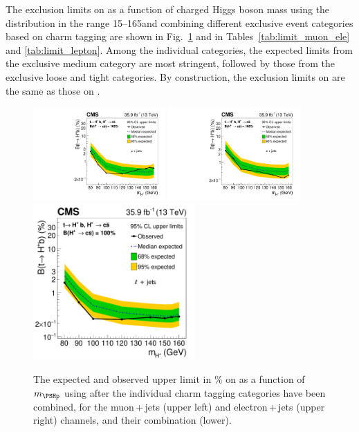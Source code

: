 The exclusion limits on \Bthb as a function of
charged Higgs boson mass using the \mjj distribution in the range 
15--165\GeV and combining
different exclusive event categories based on charm tagging are shown
in Fig.~\ref{fig:limitPlot} and in Tables~\ref{tab:limit_muon_ele} and
\ref{tab:limit_lepton}. Among the individual categories, the expected
limits from the exclusive medium category are most stringent, followed
by those from the exclusive loose and tight categories. By construction,
the exclusion limits on \Bthbbar are the same as those on \Bthb.
\begin{figure}
    \centering
    \includegraphics[width=0.45\textwidth]{Figure_004-a.pdf}
    \includegraphics[width=0.45\textwidth]{Figure_004-b.pdf}
    \includegraphics[width=0.55\textwidth]{Figure_004-c.pdf}
    \caption{The expected and observed upper limit in \% on
        \Bthb as a function of $\mhp$
        using \mjj after the individual charm tagging categories have
        been combined, for the muon\,+\,jets (upper left) and
        electron\,+\,jets (upper right) channels, and their combination (lower).}
 \label{fig:limitPlot}
\end{figure}


